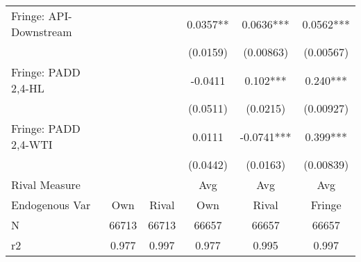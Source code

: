 {\begin{tabular}{l*{5}{c}}
\addlinespace
Fringe: API-Downstream&            &            &   0.0357** &   0.0636***&   0.0562***\\
                &            &            & (0.0159)   &(0.00863)   &(0.00567)   \\
\addlinespace
Fringe: PADD 2,4-HL&            &            &  -0.0411   &    0.102***&    0.240***\\
                &            &            & (0.0511)   & (0.0215)   &(0.00927)   \\
\addlinespace
Fringe: PADD 2,4-WTI&            &            &   0.0111   &  -0.0741***&    0.399***\\
                &            &            & (0.0442)   & (0.0163)   &(0.00839)   \\
\midrule
Rival Measure   &            &            &      Avg   &      Avg   &      Avg   \\
Endogenous Var  &      Own   &    Rival   &      Own   &    Rival   &   Fringe   \\
N               &    66713   &    66713   &    66657   &    66657   &    66657   \\
r2              &    0.977   &    0.997   &    0.977   &    0.995   &    0.997   \\
\bottomrule
\end{tabular}
}
